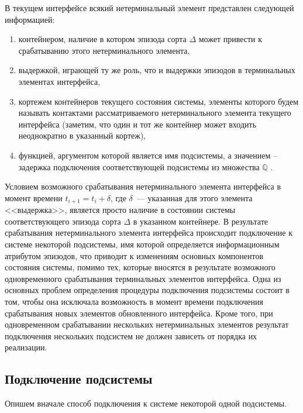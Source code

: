В текущем интерфейсе всякий нетерминальный элемент представлен следующей информацией: 
\begin{enumerate}[label=\arabic*)]
	\item контейнером, наличие в котором эпизода сорта $ \Delta $   может привести к срабатыванию этого нетерминального элемента, 
	\item  выдержкой, играющей ту же роль, что и выдержки эпизодов в терминальных элементах интерфейса, 
	\item  кортежем контейнеров текущего состояния системы, элементы которого будем называть контактами рассматриваемого нетерминального элемента текущего интерфейса (заметим, что один и тот же контейнер может входить неоднократно в указанный кортеж), 
	\item  функцией, аргументом которой является имя подсистемы, а значением – задержка подключения соответствующей подсистемы из множества $ \mathbb{Q} $ .
\end{enumerate}  

Условием возможного срабатывания нетерминального элемента интерфейса в момент времени $ t_{i+1} = t_i + \delta $, где $ \delta $~--- указанная для этого элемента <<выдержка>>, является просто наличие в состоянии системы соответствующего эпизода сорта $ \Delta $ в указанном контейнере. 
В результате срабатывания нетерминального элемента интерфейса происходит подключение к системе некоторой подсистемы, имя которой определяется информационным атрибутом эпизодов, что приводит к изменениям основных компонентов состояния системы, помимо тех, которые вносятся в результате возможного одновременного срабатывания терминальных элементов интерфейса. 
Одна из основных проблем определения процедуры подключения подсистемы состоит в том, чтобы она исключала возможность в момент времени подключения срабатывания новых элементов обновленного интерфейса. 
Кроме того, при одновременном срабатывании нескольких нетерминальных элементов результат подключения нескольких подсистем не должен зависеть от порядка их реализации.

\subsection{Подключение подсистемы}
Опишем вначале способ подключения к системе некоторой одной подсистемы.

